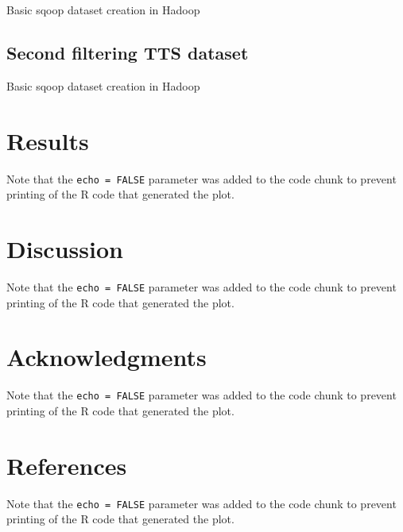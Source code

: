 \documentclass[]{article}
\begin{document}
Basic sqoop dataset creation in Hadoop

\subsection{Second filtering TTS
dataset}\label{second-filtering-tts-dataset}

Basic sqoop dataset creation in Hadoop

\section{Results}\label{results}

Note that the \texttt{echo = FALSE} parameter was added to the code
chunk to prevent printing of the R code that generated the plot.

\section{Discussion}\label{discussion}

Note that the \texttt{echo = FALSE} parameter was added to the code
chunk to prevent printing of the R code that generated the plot.

\section{Acknowledgments}\label{acknowledgments}

Note that the \texttt{echo = FALSE} parameter was added to the code
chunk to prevent printing of the R code that generated the plot.

\section{References}\label{references}

Note that the \texttt{echo = FALSE} parameter was added to the code
chunk to prevent printing of the R code that generated the plot.
\end{document}
